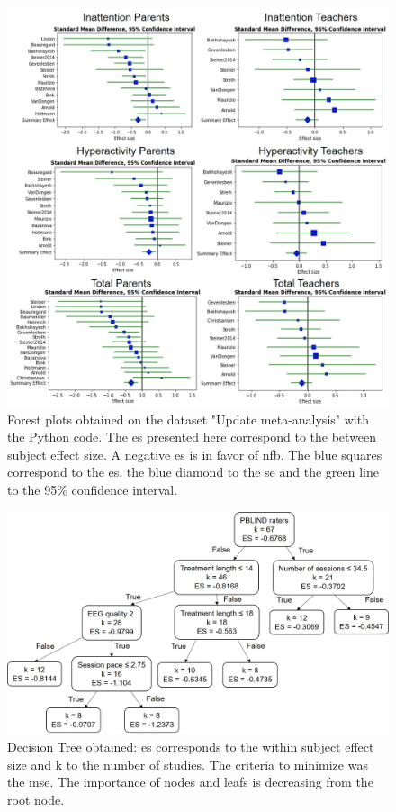 \documentclass[12pt,a4paper,english]{article}
\begin{document}
\begin{figure}[h!]
  \centering
  \includegraphics[width=1.0\linewidth]{figures/meta_review_forest_plots_update_meta_analysis_our_choices_no_colors_2-columns_fitting_image}
  \caption{Forest plots obtained on the dataset "Update meta-analysis" with the Python code. The \gls{es} presented here correspond to
	the between subject effect size. A negative \gls{es} is in favor of \gls{nfb}. 
	The blue squares correspond to the \gls{es}, the blue diamond to the \gls{se} and the green line to the 95\% confidence interval.}
  \label{Figure:meta_review_forest_plots_update_meta_analysis_our_choices_no_colors_2-columns_fitting_image}
\end{figure}

\begin{figure}[h!]
  \centering
  \includegraphics[width=1.0\linewidth]{figures/factors_analysis_decision_tree_results_no_colors_2-columns_fitting_image}
  \caption{Decision Tree obtained: \gls{es} corresponds to the within subject effect size and k to the number of studies. 
	The criteria to minimize was the \gls{mse}. The importance of nodes and leafs is decreasing
	from the root node.}
  \label{Figure:factors_analysis_decision_tree_results}
\end{figure}
\end{document}

